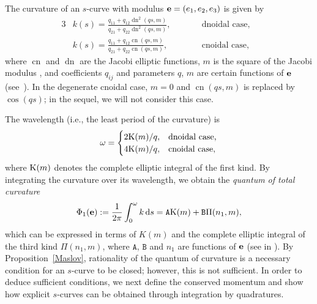 \documentclass[10pt,a4paper]{amsart}
\newcommand\kk{k} %
\newcommand{\ds}{\,{\rm d}s}
\newcommand\be{{\bf e}}
\newcommand\cn{\operatorname{cn}}
\newcommand\dn{\operatorname{dn}}
\numberwithin{equation}{section}
\begin{document}
The curvature of an $s$-curve with modulus $\be=(e_1,e_2,e_3)$ is given by
\begin{alignat}{3}
&\kk(s)= \frac{q_{11}+q_{12}\dn^2(qs,m)}{q_{21}+q_{22}\dn^2(qs,m)}, \qquad&& \text{dnoidal case},& \nonumber\\
&\kk(s)= \frac{q_{11}+q_{12}\cn(qs,m)}{q_{21}+q_{22}\cn(qs,m)}, \qquad && \text{cnoidal case}, &\label{curvaturedn}
\end{alignat}
where $\cn$ and $\dn$ are the Jacobi elliptic functions, $m$ is the square of the Jacobi modulus \cite{Law},
and coefficients $q_{ij}$ and parameters $q$, $m$ are certain functions of $\be$ (see~\cite[formulas~(256.00) and~(259.00)]{BF}).
In the degenerate cnoidal case, $m=0$ and $\cn(q s,m)$ is replaced by $\cos(q s)$; in the sequel, we will not consider this case.

The wavelength (i.e., the least period of the curvature) is
\begin{equation}
\label{wl}\omega = \begin{cases}2{\rm K}(m)/{q}, &\text{dnoidal case,}\\
4{\rm K}(m)/{q}, & \text{cnoidal case,}\end{cases}
\end{equation}
where ${\rm K}(m)$ denotes the complete elliptic integral of the first kind. By integrating the curvature
over its wavelength, we obtain the {\it quantum of total curvature}
\begin{equation}\label{curvtot}\Phi_1(\be):=\frac{1}{2\pi}\int_0^{\omega} \kk \ds={\mathtt A}{\rm K}(m)+{\mathtt B}\Pi(n_1,m),
\end{equation}
which can be expressed in terms of $K(m)$ and the complete elliptic integral of the third kind $\Pi(n_1,m)$,
where ${\mathtt A}$, ${\mathtt B}$ and $n_1$ are functions of $\be$ (see in \cite[formulas~(340.03) and (341.03)]{BF}).
By Proposition~\ref{Maslov}, rationality of the quantum of curvature is a necessary condition for
an $s$-curve to be closed; however, this is not sufficient. In order to deduce sufficient conditions, we next define the conserved momentum and show how explicit $s$-curves can be obtained through integration by quadratures.
\end{document}
